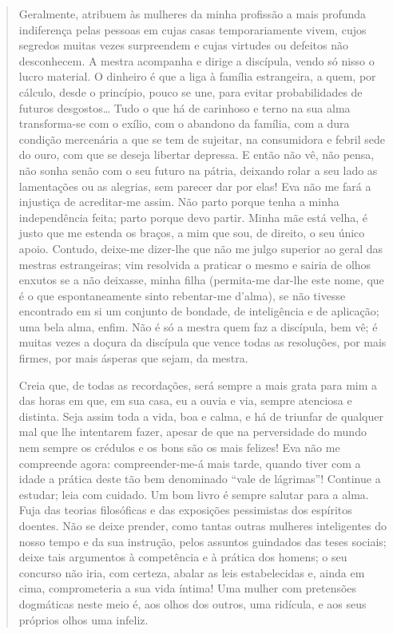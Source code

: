 {\begin{quote}
Geralmente, atribuem às mulheres da minha profissão a
mais profunda indiferença pelas pessoas em cujas casas temporariamente
vivem, cujos segredos muitas vezes surpreendem e cujas virtudes ou
defeitos não desconhecem. A mestra acompanha e dirige a discípula, vendo
só nisso o lucro material. O dinheiro é que a liga à
família estrangeira, a quem, por cálculo,
desde o princípio, pouco se une, para evitar probabilidades de
futuros desgostos\ldots{} Tudo o que há de carinhoso e terno na
sua alma transforma-se com o exílio, com o abandono da família,
com a dura condição mercenária a que se tem de sujeitar, na
consumidora e febril sede do ouro, com que se deseja libertar
depressa. E então não vê, não pensa, não sonha senão com o seu futuro
na pátria, deixando rolar a seu lado as lamentações ou as
alegrias, sem parecer dar por elas! Eva não me fará a injustiça de
acreditar-me assim. Não parto porque tenha a minha
independência feita; parto porque devo partir. Minha
mãe está velha, é justo que me estenda os braços, a mim que sou,
de direito, o seu único apoio. Contudo, deixe-me dizer-lhe que
não me julgo superior ao geral das mestras estrangeiras; vim
resolvida a praticar o mesmo e sairia de olhos enxutos se a não
deixasse, minha filha (permita-me dar-lhe este nome, que é o que
espontaneamente sinto rebentar-me d'alma), se não tivesse encontrado em
si um conjunto de bondade, de inteligência e de aplicação; uma
bela alma, enfim. Não é só a mestra quem faz a discípula, bem
vê; é muitas vezes a doçura da discípula que vence todas as resoluções,
por mais firmes, por mais ásperas que sejam, da mestra.

Creia que, de todas as recordações, será sempre a mais grata
para mim a das horas em que, em sua casa, eu a ouvia e via, sempre
atenciosa e distinta. Seja assim toda a vida, boa e calma, e há de
triunfar de qualquer mal que lhe intentarem fazer, apesar de que na
perversidade do mundo nem sempre os crédulos e os bons são os mais
felizes! Eva não me compreende agora: compreender-me-á mais tarde,
quando tiver com a idade a prática deste tão bem denominado
``vale de lágrimas''! Continue a estudar; leia com cuidado. Um
bom livro é sempre salutar para a alma. Fuja das teorias filosóficas e
das exposições pessimistas dos espíritos doentes. Não se deixe
prender, como tantas outras mulheres inteligentes do nosso tempo e da
sua instrução, pelos assuntos guindados das teses
sociais; deixe tais argumentos à competência e à prática dos
homens; o seu concurso não iria, com certeza, abalar as leis
estabelecidas e, ainda em cima, comprometeria a sua vida íntima! Uma
mulher com pretensões dogmáticas neste meio é, aos olhos dos
outros, uma ridícula, e aos seus próprios olhos uma
infeliz.


\end{quote}}
